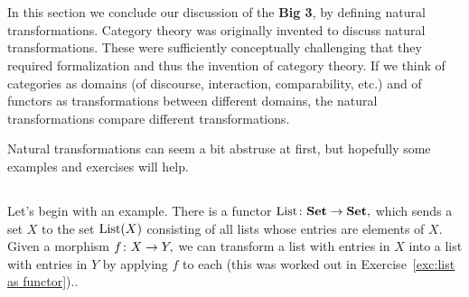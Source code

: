 \documentclass[../main/CT4S-EN-RU]{subfiles}
\begin{document}
\section{}\label{sec:nat trans}

\begin{blockENG}
In this section we conclude our discussion of the {\bf Big 3}, by defining natural transformations. Category theory was originally invented to discuss natural transformations. These were sufficiently conceptually challenging that they required formalization and thus the invention of category theory. If we think of categories as domains (of discourse, interaction, comparability, etc.) and of functors as transformations between different domains, the natural transformations compare different transformations.
\end{blockENG}

\begin{blockRUS}
\end{blockRUS}

\begin{blockENG}
Natural transformations can seem a bit abstruse at first, but hopefully some examples and exercises will help.
\end{blockENG}

\begin{blockRUS}
\end{blockRUS}


\subsection{}

\begin{blockENG}
Let's begin with an example. There is a functor $\operatorname{List}\colon{\mathbf{Set}}\rightarrow{\mathbf{Set}},$ which sends a set $X$ to the set $\operatorname{List}(X)$ consisting of all lists whose entries are elements of $X.$ Given a morphism $f\colon X\rightarrow Y,$ we can transform a list with entries in $X$ into a list with entries in $Y$ by applying $f$ to each (this was worked out in Exercise~\ref{exc:list as functor}).. 
\end{blockENG}

\begin{blockRUS}
\end{blockRUS}
\end{document}
